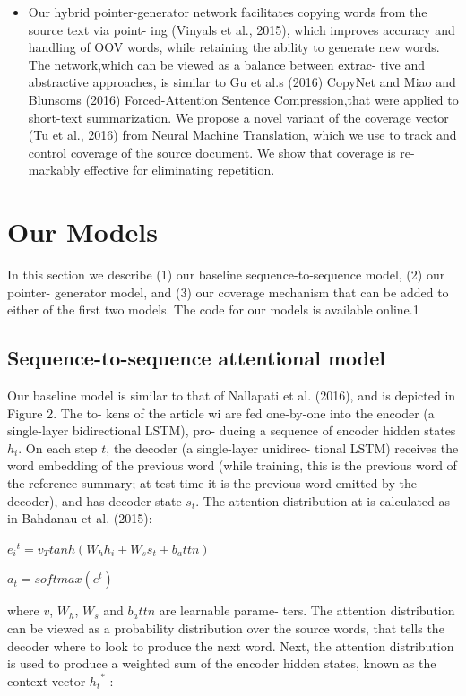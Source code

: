 \documentclass[UTF8]{ctexart}
\begin{document}
\begin{itemize}
    \item  Our hybrid pointer-generator network facilitates copying words from the source text via point-
    ing (Vinyals et al., 2015), which improves accuracy and handling of OOV words, while retaining
    the ability to generate new words. The network,which can be viewed as a balance between extrac-
    tive and abstractive approaches, is similar to Gu et al.s (2016) CopyNet and Miao and Blunsoms
    (2016) Forced-Attention Sentence Compression,that were applied to short-text summarization. We
    propose a novel variant of the coverage vector (Tu et al., 2016) from Neural Machine Translation,
    which we use to track and control coverage of the source document. We show that coverage is re-
    markably effective for eliminating repetition.
    \end{itemize}

    \section{Our Models}
    In this section we describe (1) our baseline sequence-to-sequence model, (2) our pointer-
    generator model, and (3) our coverage mechanism that can be added to either of the first two models.
    The code for our models is available online.1

    \subsection{Sequence-to-sequence attentional model}
    Our baseline model is similar to that of Nallapati
et al. (2016), and is depicted in Figure 2. The to-
kens of the article wi are fed one-by-one into the
encoder (a single-layer bidirectional LSTM), pro-
ducing a sequence of encoder hidden states $h_i$. On
each step $t$, the decoder (a single-layer unidirec-
tional LSTM) receives the word embedding of the
previous word (while training, this is the previous
word of the reference summary; at test time it is
the previous word emitted by the decoder), and
has decoder state $s_t$. The attention distribution at
is calculated as in Bahdanau et al. (2015):

$    {e_i}^t=v_Ttanh(W_h h_i +W_s s_t + b_attn)  $

$     a_t=softmax(e^t)   $

where $v$, $W_h$, $W_s$ and $b_attn$ are learnable parame-
ters. The attention distribution can be viewed as a probability distribution over the source words,
that tells the decoder where to look to produce the
next word. Next, the attention distribution is used
to produce a weighted sum of the encoder hidden
states, known as the context vector ${h_t}^*$ :
\end{document}
